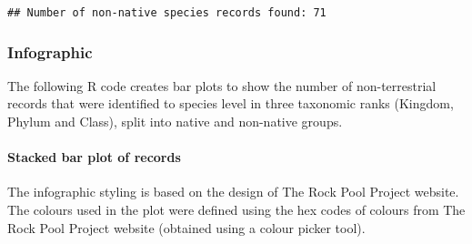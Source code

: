 \documentclass[
  12pt,
]{article}
\newenvironment{Shaded}{\begin{snugshade}}{\end{snugshade}}
\newcommand{\CommentTok}[1]{\textcolor[rgb]{0.56,0.35,0.01}{\textit{#1}}}
\newcommand{\FunctionTok}[1]{\textcolor[rgb]{0.13,0.29,0.53}{\textbf{#1}}}
\newcommand{\NormalTok}[1]{#1}
\newcommand{\OtherTok}[1]{\textcolor[rgb]{0.56,0.35,0.01}{#1}}
\newcommand{\SpecialCharTok}[1]{\textcolor[rgb]{0.81,0.36,0.00}{\textbf{#1}}}
\newcommand{\StringTok}[1]{\textcolor[rgb]{0.31,0.60,0.02}{#1}}
\begin{document}
\begin{Shaded}
\end{Shaded}

\begin{verbatim}
## Number of non-native species records found: 71
\end{verbatim}

\hfill\break

\subsubsection{Infographic}\label{infographic}

The following R code creates bar plots to show the number of
non-terrestrial records that were identified to species level in three
taxonomic ranks (Kingdom, Phylum and Class), split into native and
non-native groups.

\hfill\break

\paragraph{Stacked bar plot of
records}\label{stacked-bar-plot-of-records}

The infographic styling is based on the design of The Rock Pool Project
website. The colours used in the plot were defined using the hex codes
of colours from The Rock Pool Project website (obtained using a colour
picker tool).
\end{document}
